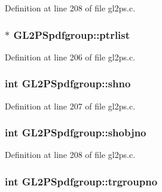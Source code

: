 Definition at line 208 of file gl2ps.\+c.

\hypertarget{struct_g_l2_p_spdfgroup_ae61982c7b5704fb378003afddaa372a0}{}
\subsubsection[{ptrlist}]{$\ast$ G\+L2\+P\+Spdfgroup\+::ptrlist}\label{struct_g_l2_p_spdfgroup_ae61982c7b5704fb378003afddaa372a0}


Definition at line 206 of file gl2ps.\+c.

\hypertarget{struct_g_l2_p_spdfgroup_a328d66530e598942292e1ca5c54cc195}{}
\subsubsection[{shno}]{\setlength{\rightskip}{0pt plus 5cm}int G\+L2\+P\+Spdfgroup\+::shno}\label{struct_g_l2_p_spdfgroup_a328d66530e598942292e1ca5c54cc195}


Definition at line 207 of file gl2ps.\+c.

\hypertarget{struct_g_l2_p_spdfgroup_a693eda3aa7df89ab96024c75875e0a5f}{}
\subsubsection[{shobjno}]{\setlength{\rightskip}{0pt plus 5cm}int G\+L2\+P\+Spdfgroup\+::shobjno}\label{struct_g_l2_p_spdfgroup_a693eda3aa7df89ab96024c75875e0a5f}


Definition at line 208 of file gl2ps.\+c.

\hypertarget{struct_g_l2_p_spdfgroup_a31a492158553a24a1f34894aca2e1273}{}
\subsubsection[{trgroupno}]{\setlength{\rightskip}{0pt plus 5cm}int G\+L2\+P\+Spdfgroup\+::trgroupno}\label{struct_g_l2_p_spdfgroup_a31a492158553a24a1f34894aca2e1273}


